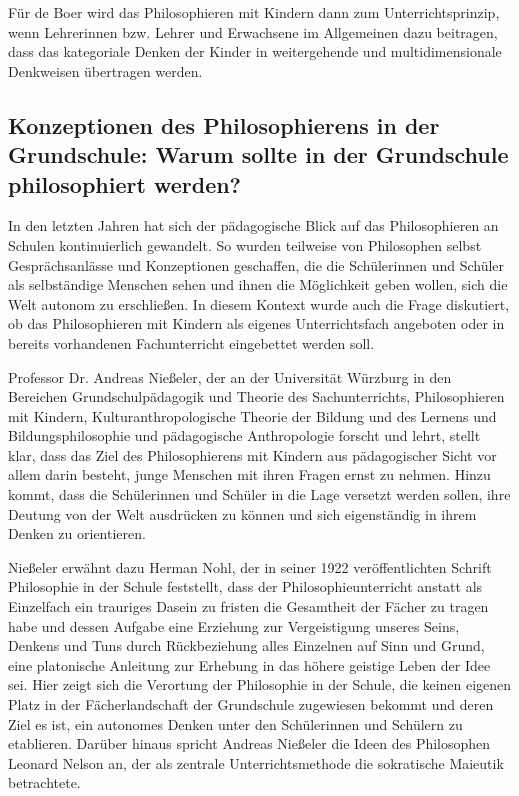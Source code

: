 Für de Boer wird das Philosophieren mit Kindern dann zum Unterrichtsprinzip, wenn Lehrerinnen bzw. Lehrer und Erwachsene im Allgemeinen dazu beitragen, dass das kategoriale Denken der Kinder in weitergehende und multidimensionale Denkweisen übertragen werden.


\newpage
\subsection{Konzeptionen des Philosophierens in der Grundschule: Warum sollte in der Grundschule philosophiert werden?}

In den letzten Jahren hat sich der pädagogische Blick auf das Philosophieren an Schulen kontinuierlich gewandelt. 
So wurden teilweise von Philosophen selbst Gesprächsanlässe und Konzeptionen geschaffen, die die Schülerinnen und Schüler als selbständige Menschen sehen und ihnen die Möglichkeit geben wollen, sich die Welt autonom zu erschließen\cite[S.\,617]{AN13}. 
In diesem Kontext wurde auch die Frage diskutiert, ob das Philosophieren mit Kindern als eigenes Unterrichtsfach angeboten oder in bereits vorhandenen Fachunterricht eingebettet werden soll. 

Professor Dr. Andreas Nießeler, der an der Universität Würzburg in den Bereichen Grundschulpädagogik und Theorie des Sachunterrichts, Philosophieren mit Kindern, Kulturanthropologische Theorie der Bildung und des Lernens und Bildungsphilosophie und pädagogische Anthropologie forscht und lehrt, stellt klar, dass das Ziel des Philosophierens mit Kindern aus pädagogischer Sicht vor allem darin besteht, \glqq junge Menschen mit ihren Fragen ernst zu nehmen\grqq{}\cite[S.\,617]{AN13}.
Hinzu kommt, dass die Schülerinnen und Schüler in die Lage versetzt werden sollen, ihre Deutung von der Welt ausdrücken zu können und sich eigenständig in ihrem Denken zu orientieren. 

Nießeler erwähnt dazu Herman Nohl, der in seiner 1922 veröffentlichten Schrift \glqq Philosophie in der Schule\grqq{} feststellt, dass der Philosophieunterricht \glqq anstatt als Einzelfach ein trauriges Dasein zu fristen die Gesamtheit der Fächer zu tragen habe und dessen Aufgabe eine Erziehung zur \glqq Vergeistigung unseres Seins, Denkens und Tuns durch Rückbeziehung alles Einzelnen auf Sinn und Grund, eine platonische Anleitung zur Erhebung in das höhere geistige Leben der Idee\grqq{} sei.\grqq{}\cite[S.\,618]{AN13}
Hier zeigt sich die Verortung der Philosophie in der Schule, die keinen eigenen Platz in der Fächerlandschaft der Grundschule zugewiesen bekommt und deren Ziel es ist, ein autonomes Denken unter den Schülerinnen und Schülern zu etablieren. 
Darüber hinaus spricht Andreas Nießeler die Ideen des Philosophen Leonard Nelson an, der als zentrale Unterrichtsmethode die sokratische Maieutik betrachtete. 

